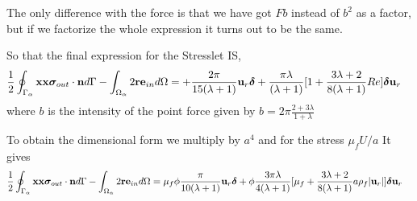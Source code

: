 The only difference with the force is that we have got $Fb$ instead of $b^2$ as a factor, but if we factorize the whole expression it turns out to be the same. 

So that the final expression for the Stresslet IS, 
\begin{align}
    \frac{1}{2}\oint_{\Gamma_{\alpha}} \textbf{xx}\bm\sigma_{out}\cdot \textbf{n} d\Gamma
    - \int_{\Omega_{\alpha}} 2\textbf{r}\textbf{e}_{in} d\Omega &=
    +\frac{2\pi}{15(\lambda +1)} \textbf{u}_r \bm\delta
    + \frac{\pi \lambda }{(\lambda+1)}
    [
        1
        +
        \frac{3\lambda+2}{8(\lambda+1)} Re 
    ]\bm\delta \textbf{u}_r 
\end{align}
where $b$ is the intensity of the point force given by $b = 2 \pi \frac{2+3\lambda}{1+\lambda}$


To obtain the dimensional form we multiply by $a^4$ and for the stress $\mu_f U/a$
It gives 
\begin{align}
    \frac{1}{2}\oint_{\Gamma_{\alpha}} \textbf{xx}\bm\sigma_{out}\cdot \textbf{n} d\Gamma
    - \int_{\Omega_{\alpha}} 2\textbf{r}\textbf{e}_{in} d\Omega &=
    \mu_f \phi  \frac{\pi}{10(\lambda +1)} \textbf{u}_r \bm\delta
    +\phi  \frac{3\pi \lambda }{4(\lambda+1)}
    [
        \mu_f  
        +
        \frac{3\lambda+2}{8(\lambda+1)} 
        a \rho_f |\textbf{u}_r|
    ]\bm\delta \textbf{u}_r 
\end{align}

